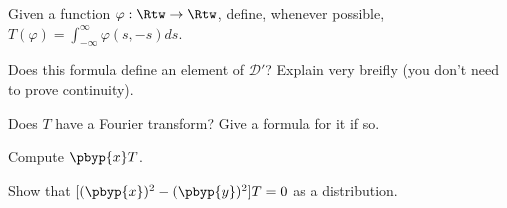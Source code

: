 Given a function $\varphi:\Rtw\rightarrow \Rtw$, define, whenever
possible, $T(\varphi)=\int_{-\infty}^{\infty}\varphi(s,-s)ds$.
\begin{alist}
\item Does this formula define an element of $\mathcal{D}'$? Explain
very breifly (you don't need to prove continuity).
\item Does $T$ have a Fourier transform? Give a formula for it if so.
\item Compute $\pbyp{x}T$.
\item Show that $[(\pbyp{x})^2-(\pbyp{y})^2]T=0$ as a 
distribution.
\end{alist}
